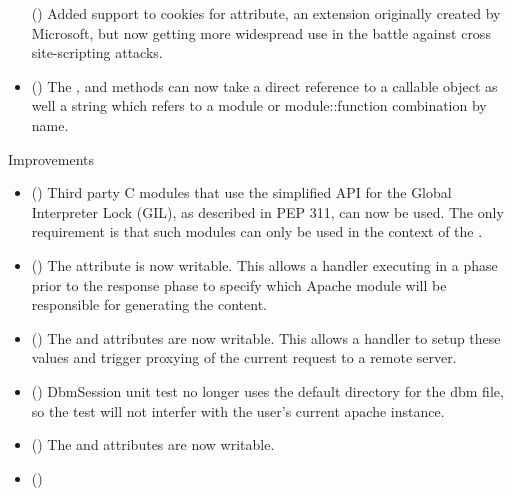 \begin{itemize}
      ()
      Added support to cookies for  attribute, an extension
      originally created by Microsoft, but now getting more widespread use
      in the battle against cross site-scripting attacks.
    \item
      ()
      The ,  and
       methods can now take a direct
      reference to a callable object as well a string which refers to a
      module or module::function combination by name.
  \end{itemize}

  Improvements

  \begin{itemize}
    \item
      ()
      Third party C modules that use the simplified API for the Global
      Interpreter Lock (GIL), as described in PEP 311, can now be used. The
      only requirement is that such modules can only be used in the context
      of the .
    \item
      ()
      The  attribute is now writable. This allows a handler
      executing in a phase prior to the response phase to specify which
      Apache module will be responsible for generating the content.
    \item
      ()
      The  and  attributes are now writable.
      This allows a handler to setup these values and trigger proxying of the
      current request to a remote server.
    \item
      ()
      DbmSession unit test no longer uses the default directory for the dbm file,
      so the test will not interfer with the user's current apache instance.
    \item
      ()
      The  and  attributes are
      now writable.
    \item
      ()

\end{itemize}
